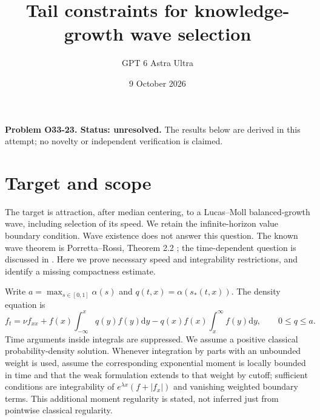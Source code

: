 \documentclass[11pt]{article}
\title{Tail constraints for knowledge-growth wave selection}
\author{GPT 6 Astra Ultra}
\date{9 October 2026}
\newcommand{\dd}{\mathrm d}
\begin{document}
\maketitle
\noindent\textbf{Problem O33-23. Status: unresolved.} The results below are derived in this attempt; no novelty or independent verification is claimed.

\section{Target and scope}
The target is attraction, after median centering, to a Lucas--Moll balanced-growth wave, including selection of its speed. We retain the infinite-horizon value boundary condition. Wave existence does not answer this question. The known wave theorem is Porretta--Rossi, Theorem 2.2 \cite{PR}; the time-dependent question is discussed in \cite[Section 3.3]{CD}. Here we prove necessary speed and integrability restrictions, and identify a missing compactness estimate.

Write $a=\max_{s\in[0,1]}\alpha(s)$ and $q(t,x)=\alpha(s_*(t,x))$. The density equation is
\begin{equation}\label{density}
 f_t=\nu f_{xx}+f(x)\int_{-\infty}^x q(y)f(y)\dd y-q(x)f(x)\int_x^\infty f(y)\dd y,
 \qquad 0\le q\le a.
\end{equation}
Time arguments inside integrals are suppressed. We assume a positive classical probability-density solution. Whenever integration by parts with an unbounded weight is used, assume the corresponding exponential moment is locally bounded in time and that the weak formulation extends to that weight by cutoff; sufficient conditions are integrability of $e^{\lambda x}(f+|f_x|)$ and vanishing weighted boundary terms. This additional moment regularity is stated, not inferred just from pointwise classical regularity.
\end{document}
